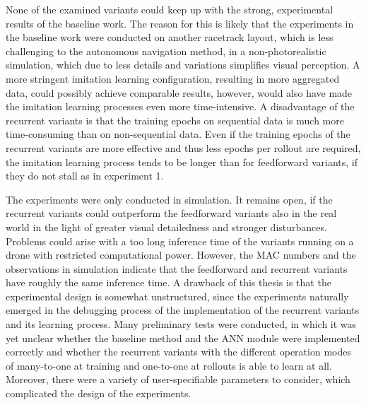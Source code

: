 None of the examined variants could keep up with the strong, experimental results of the baseline work.
The reason for this is likely that the experiments in the baseline work 
were conducted on another racetrack layout, 
which is less challenging to the autonomous navigation method,
in a non-photorealistic simulation,
which due to less details and variations simplifies visual perception.
A more stringent imitation learning configuration,
resulting in more aggregated data,
could possibly achieve comparable results,
however, would also have made the imitation learning processes even more time-intensive.
A disadvantage of the recurrent variants is that the training epochs on sequential data
is much more time-consuming than on non-sequential data.
Even if the training epochs of the recurrent variants are more effective
and thus less epochs per rollout are required,
the imitation learning process tends to be longer than for feedforward variants,
if they do not stall as in experiment 1.

The experiments were only conducted in simulation.
It remains open, if the recurrent variants could outperform the feedforward variants also in the real world
in the light of greater visual detailedness and stronger disturbances.
Problems could arise with a too long inference time of the variants running
on a drone with restricted computational power. However, the MAC numbers and the observations in simulation
indicate that the feedforward and recurrent variants have roughly the same inference time.
A drawback of this thesis is that the experimental design is somewhat unstructured,
since the experiments naturally emerged in the debugging process of the
implementation of the recurrent variants and its learning process.
Many preliminary tests were conducted,
in which it was yet unclear whether the baseline method and the ANN module
were implemented correctly
and whether the recurrent variants
with the different operation modes of many-to-one at training 
and one-to-one at rollouts is able to learn at all.
Moreover, there were a variety of user-specifiable parameters to consider,
which complicated the design of the experiments.



